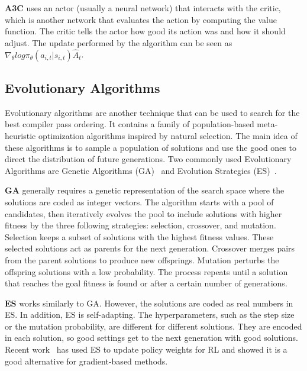 \textbf{A3C} uses an actor (usually a neural network) that interacts with the critic, which is another network that evaluates the action by computing the value function. The critic tells the actor how good its action was and how it should adjust. The update performed by the algorithm
can be seen as $\nabla_\theta log\pi_\theta(a_{i,t}|s_{i,t})\hat{A}_t$.


\subsection{Evolutionary Algorithms}
Evolutionary algorithms are another technique that can be used to search for the best compiler pass ordering.  
It contains a family of population-based meta-heuristic optimization algorithms inspired by natural selection. The main idea of these algorithms is to sample a population of solutions and use the good ones to direct the distribution of future generations. Two commonly used Evolutionary Algorithms are Genetic Algorithms (GA)~\cite{goldberg2006genetic} and Evolution Strategies (ES)~\cite{conti2018improving}.

\textbf{GA} generally requires a genetic representation of the search space where the solutions are coded as integer vectors.  The algorithm starts with a pool of candidates, then iteratively evolves the pool to include solutions with higher fitness by the three following strategies: selection, crossover, and mutation. Selection keeps a subset of solutions with the highest fitness values. These selected solutions act as parents for the next generation. Crossover merges pairs from the parent solutions to produce new offsprings. Mutation perturbs the offspring solutions with a low probability. The process repeats until a solution that reaches the goal fitness is found or after a certain number of generations. 

\textbf{ES} works similarly to GA. However, the solutions are coded as real numbers in ES. In addition, ES is self-adapting. The hyperparameters, such as the step size or the mutation probability, are different for different solutions. They are encoded in each solution,  so good settings get to the next generation with good solutions. Recent work~\cite{salimans2017evolution} has used ES to update policy weights for RL and showed it is a good alternative for gradient-based methods. 